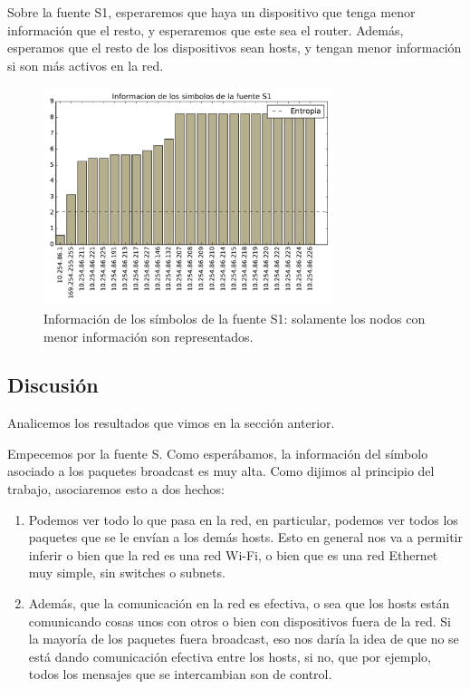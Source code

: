 Sobre la fuente S1, esperaremos que haya un dispositivo que tenga menor información que el resto, y esperaremos que este sea el router. Además, esperamos que el resto de los dispositivos sean hosts, y tengan menor información si son más activos en la red.

\begin{figure}[H]
  \centering
  \includegraphics[width=8.5cm]{exp_starbucks/grafico3.pdf}
  \caption{ \normalfont Información de los símbolos de la fuente S1: solamente los nodos con menor información son representados.}
\end{figure}

\subsection{Discusión}

Analicemos los resultados que vimos en la sección anterior.

Empecemos por la fuente S. Como esperábamos, la información del símbolo asociado a los paquetes broadcast es muy alta. Como dijimos al principio del trabajo, asociaremos esto a dos hechos: 

\begin{enumerate}
  \item Podemos ver todo lo que pasa en la red, en particular, podemos ver todos los paquetes que se le envían a los demás hosts.
    Esto en general nos va a permitir inferir o bien que la red es una red Wi-Fi, o bien que es una red Ethernet muy simple, sin switches o subnets.
  \item Además, que la comunicación en la red es efectiva, o sea que los hosts están comunicando cosas unos con otros o bien con dispositivos fuera de la red.
    Si la mayoría de los paquetes fuera broadcast, eso nos daría la idea de que no se está dando comunicación efectiva entre los hosts, si no, que por ejemplo, todos los mensajes que se intercambian son de control.
\end{enumerate}

